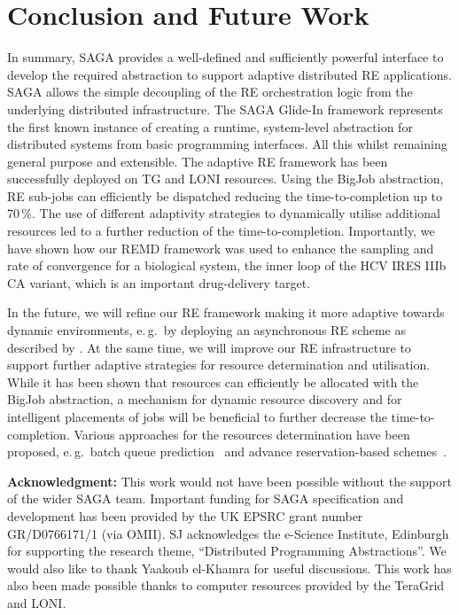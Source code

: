 \documentclass{rspublic}
\newcommand{\glidein}[1]{Glide-In }
\begin{document}
\section{Conclusion and Future Work}

In summary, SAGA provides a well-defined and sufficiently powerful
interface to develop the required abstraction to support adaptive
distributed RE applications.  SAGA allows the simple decoupling
of the RE orchestration logic from the underlying distributed
infrastructure. The SAGA \glidein\ framework represents the first
known instance of creating a runtime, system-level abstraction for
distributed systems from basic programming interfaces. All this whilst
remaining general purpose and extensible.  The adaptive RE framework
has been successfully deployed on TG and LONI resources.  Using
the BigJob abstraction, RE sub-jobs can efficiently be dispatched
reducing the time-to-completion up to 70\,\%. The use of different
adaptivity strategies to dynamically utilise additional resources led
to a further reduction of the time-to-completion.  Importantly, we
have shown how our REMD framework was used to enhance the
sampling and rate of convergence for a biological system, the inner
loop of the HCV IRES IIIb CA variant, which is an important
drug-delivery target.

In the future, we will refine our RE framework making it
more adaptive towards dynamic environments, e.\,g.\ by deploying  
an asynchronous RE scheme as described by \citet{Gallicchio:2007yq}.
At the same time, we will improve our RE infrastructure to support
further adaptive strategies for resource determination and
utilisation.  While it has been shown that resources can efficiently
be allocated with the BigJob abstraction, a mechanism for dynamic
resource discovery and for intelligent placements of jobs will be
beneficial to further decrease the time-to-completion.  Various
approaches for the resources determination have been proposed, e.\,g.\
batch queue prediction~\citep{1254939,Chakraborty:2008nx} and advance
reservation-based schemes~\citep{Jeske:2007wj}. 

\vspace{0.1in}
\noindent
{\bf Acknowledgment:} This work would not have been possible without the support of 
	  the wider SAGA team. Important funding for SAGA
	  specification and development has been provided by the UK EPSRC
	  grant number GR/D0766171/1 (via OMII).  SJ acknowledges the
	  e-Science Institute, Edinburgh for supporting the research theme,
	  ``Distributed Programming Abstractions''.  We would also like to
	  thank Yaakoub el-Khamra for useful discussions. This work has also
	  been made possible thanks to computer resources provided by the
	  TeraGrid and LONI.        
\end{document}

